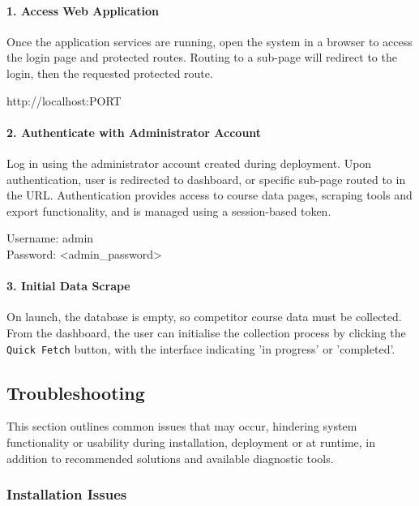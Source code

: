\paragraph{1. Access Web Application}

Once the application services are running, open the system in a browser to access the login page and protected routes. Routing to a sub-page will redirect to the login, then the requested protected route. 

\begin{commandbox}
http://localhost:PORT
\end{commandbox}

\paragraph{2. Authenticate with Administrator Account}
Log in using the administrator account created during deployment. Upon authentication, user is redirected to dashboard, or specific sub-page routed to in the URL. Authentication provides access to course data pages, scraping tools and export functionality, and is managed using a session-based token. 

\begin{commandbox}
Username: admin \\
Password: \textless admin\_password\textgreater
\end{commandbox}

\paragraph{3. Initial Data Scrape}
On launch, the database is empty, so competitor course data must be collected. From the dashboard, the user can initialise the collection process by clicking the \texttt{Quick Fetch} button, with the interface indicating 'in progress' or 'completed'.

\subsection{Troubleshooting}
This section outlines common issues that may occur, hindering system functionality or usability during installation, deployment or at runtime, in addition to recommended solutions and available diagnostic tools.

\subsubsection{Installation Issues}

